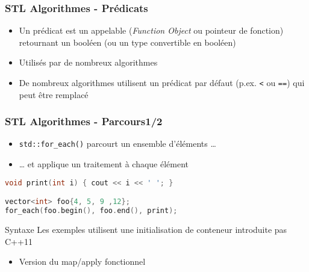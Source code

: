 \documentclass[C++.tex]{subfiles}
\begin{document}
\begin{frame}
	\frametitle{STL Algorithmes - Prédicats}
	\begin{itemize}
		\item Un prédicat est un \og appelable\fg{} (\textit{Function Object} ou pointeur de fonction) retournant un booléen (ou un type convertible en booléen)
		\item Utilisés par de nombreux algorithmes
		\item De nombreux algorithmes utilisent un prédicat par défaut (p.ex. \lstinline|<| ou \lstinline|==|) qui peut être remplacé
	\end{itemize}
\end{frame}

\begin{frame}[fragile]
	\frametitle{STL Algorithmes - Parcours\titlehfill{}1/2}
	\begin{itemize}
		\item \lstinline|std::for_each()| parcourt un ensemble d'éléments \ldots
		\item \ldots{} et applique un traitement à chaque élément
	\end{itemize}

	\begin{lstlisting}[language=C++]
void print(int i) { cout << i << ' '; }

vector<int> foo{4, 5, 9 ,12};
for_each(foo.begin(), foo.end(), print);\end{lstlisting}

	\begin{alertblock}{Syntaxe}
		Les exemples utilisent une initialisation de conteneur introduite pas C++11
	\end{alertblock}

	\begin{itemize}
		\item Version du map/apply fonctionnel
	\end{itemize}
\end{frame}
\end{document}
